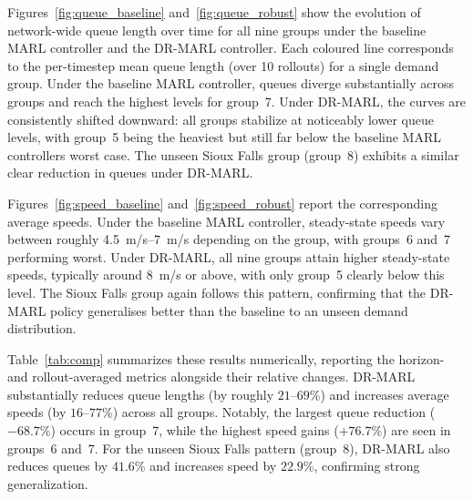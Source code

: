 \documentclass{ifacconf}
\newcommand{\1}{\mbox{1}\hspace{-0.25em}\mbox{l}}
\begin{document}
Figures~\ref{fig:queue_baseline} and~\ref{fig:queue_robust} show the evolution of network-wide queue length over time for all nine groups under the baseline MARL controller and the DR-MARL controller. Each coloured line corresponds to the per-timestep mean queue length (over 10 rollouts) for a single demand group. Under the baseline MARL controller, queues diverge substantially across groups and reach the highest levels for group~7. Under DR-MARL, the curves are consistently shifted downward: all groups stabilize at noticeably lower queue levels, with group~5 being the heaviest but still far below the baseline MARL controllers worst case. The unseen Sioux Falls group (group~8) exhibits a similar clear reduction in queues under DR-MARL.


Figures~\ref{fig:speed_baseline} and~\ref{fig:speed_robust} report the corresponding average speeds. Under the baseline MARL controller, steady-state speeds vary between roughly \SIrange{4.5}{7}{m/s} depending on the group, with groups~6 and~7 performing worst. Under DR-MARL, all nine groups attain higher steady-state speeds, typically around \SI{8}{m/s} or above, with only group~5 clearly below this level. The Sioux Falls group again follows this pattern, confirming that the DR-MARL policy generalises better than the baseline to an unseen demand distribution.




Table~\ref{tab:comp} summarizes these results numerically, reporting the horizon- and rollout-averaged metrics alongside their relative changes. DR-MARL substantially reduces queue lengths (by roughly $21$–$69$\%) and increases average speeds (by $16$–$77$\%) across all groups. Notably, the largest queue reduction ($-68.7$\%) occurs in group~7, while the highest speed gains ($+76.7$\%) are seen in groups~6 and~7. For the unseen Sioux Falls pattern (group~8), DR-MARL also reduces queues by $41.6$\% and increases speed by $22.9$\%, confirming strong generalization.
\end{document}
